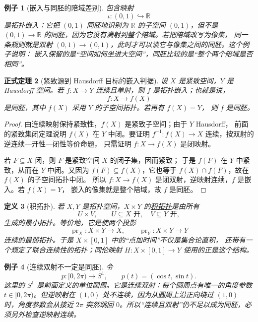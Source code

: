 \documentclass[UTF8,fontset=none,a4paper,11pt]{ctexart}
\theoremstyle{foundation-definition}
\newtheorem{definition}{定义}[section]
\theoremstyle{foundation-theorem}
\newtheorem{theorem}[definition]{正式定理}
\theoremstyle{foundation-proposition}
\theoremstyle{foundation-example}
\newtheorem{example}[definition]{例子}
\theoremstyle{foundation-remark}
\theoremstyle{foundation-theorem}
\newcommand{\term}[2]{\hyperref[#1]{#2}}
\begin{document}
\begin{example}[嵌入与同胚的陪域差别]\label{ex:embedding-homeomorphism-codomain}
包含映射
\[
\iota:(0,1)\hookrightarrow\mathbb R
\]
是拓扑嵌入：它把 \((0,1)\) 同胚地识别为 \(\mathbb R\) 的子空间 \((0,1)\)，但不是
\((0,1)\to\mathbb R\) 的同胚，因为它没有满射到整个陪域。若把陪域改写为像集，
同一条规则就是双射 \((0,1)\to(0,1)\)，此时才可以谈它与像集之间的同胚。这个例子说明：
嵌入保留的是“空间如何坐进大空间”，同胚比较的是“整个两个陪域是否相同”。
\end{example}

\begin{theorem}[紧致源到 Hausdorff 目标的嵌入判据]\label{thm:compact-continuous-injection-embedding}
设 \(X\) 是紧致空间，\(Y\) 是 Hausdorff 空间。若
\(f:X\to Y\) 连续且单射，则 \(f\) 是拓扑嵌入；也就是说，
\[
f:X\longrightarrow f(X)
\]
是同胚，其中 \(f(X)\) 采用 \(Y\) 的子空间拓扑。若再有 \(f(X)=Y\)，
则 \(f\) 是同胚。
\end{theorem}

\begin{proof}
由连续映射保持紧致性，\(f(X)\) 是紧致子空间；由于 \(Y\) Hausdorff，
前面的紧致集闭定理说明 \(f(X)\) 在 \(Y\) 中闭。要证明
\(f^{-1}:f(X)\to X\) 连续，按双射的逆连续—开性—闭性等价命题，
只需证明 \(f:X\to f(X)\) 是闭映射。

若 \(F\subseteq X\) 闭，则 \(F\) 是紧致空间 \(X\) 的闭子集，因而紧致；
于是 \(f(F)\) 在 \(Y\) 中紧致，从而在 \(Y\) 中闭。又因为
\(f(F)\subseteq f(X)\)，它也等于 \(f(X)\cap f(F)\)，故在 \(f(X)\) 的子空间拓扑中闭。
所以 \(f:X\to f(X)\) 是闭双射，逆映射连续，\(f\) 是嵌入。若 \(f(X)=Y\)，
嵌入的像集就是整个陪域，故 \(f\) 是同胚。
\end{proof}

\begin{definition}[积拓扑]\label{def:product-topology}
若 \(X,Y\) 是拓扑空间，\(X\times Y\) 的\term{def:product-topology}{积拓扑}是由所有
\[
U\times V,\qquad U\subseteq X\text{ 开},\quad V\subseteq Y\text{ 开},
\]
生成的最小拓扑。等价地，它是使两个投影
\[
\operatorname{pr}_X:X\times Y\to X,\qquad
\operatorname{pr}_Y:X\times Y\to Y
\]
连续的最弱拓扑。于是 \(X\times[0,1]\) 中的“点加时间”不仅是集合论直积，
还带有一个规定了联合连续性的拓扑；同伦映射 \(H:X\times[0,1]\to Y\) 使用的正是这个结构。
\end{definition}

\begin{example}[连续双射不一定是同胚]
令
\[
p:[0,2\pi)\longrightarrow S^1,\qquad
p(t)=(\cos t,\sin t).
\]
这里的 \(S^1\) 是前面定义的单位圆周。它是连续双射：每个圆周点有唯一的角度参数
\(t\in[0,2\pi)\)。但逆映射在
\((1,0)\) 处不连续，因为从圆周上沿正向绕过 \((1,0)\) 时，角度参数会从接近
\(2\pi\) 突然跳回 \(0\)。所以“连续且双射”仍不足以成为同胚，必须另外检查逆映射连续。
\end{example}
\end{document}
